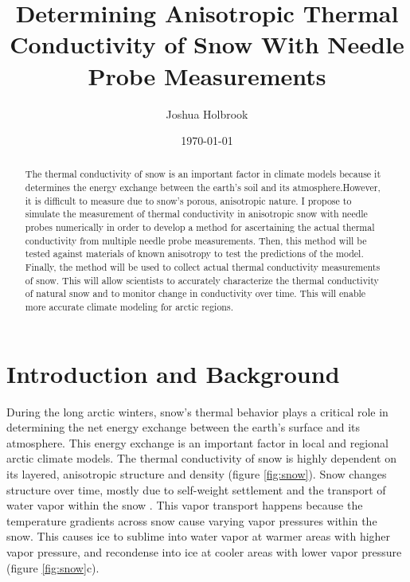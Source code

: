 \documentclass[12pt, letterpaper]{article}
\title{Determining Anisotropic Thermal Conductivity of Snow With Needle Probe Measurements}
\author{Joshua Holbrook}
\date{\today}
\begin{document}
\maketitle

\begin{abstract}
The thermal conductivity of snow is an important factor in climate models because it determines the energy exchange between the earth's soil and its atmosphere.However, it is difficult to measure due to snow's porous, anisotropic nature. I propose to simulate the measurement of thermal conductivity in anisotropic snow with needle probes numerically in order to develop a method for ascertaining the actual thermal conductivity from multiple needle probe measurements. Then, this method will be tested against materials of known anisotropy to test the predictions of the model. Finally, the method will be used to collect actual thermal conductivity measurements of snow. This will allow scientists to accurately characterize the thermal conductivity of natural snow and to monitor change in conductivity over time. This will enable more accurate climate modeling for arctic regions.
\end{abstract}


\section{Introduction and Background}

During the long arctic winters, snow's thermal behavior plays a critical role in determining the net energy exchange between the earth's surface and its atmosphere. This energy exchange is an important factor in local and regional arctic climate models. The thermal conductivity of snow is highly dependent on its layered, anisotropic structure and density (figure \ref{fig:snow}). Snow changes structure over time, mostly due to self-weight settlement and the transport of water vapor within the snow \cite{sturm2}. This vapor transport happens because the temperature gradients across snow cause varying vapor pressures within the snow. This causes ice to sublime into water vapor at warmer areas with higher vapor pressure, and recondense into ice at cooler areas with lower vapor pressure (figure \ref{fig:snow}c).
\end{document}
